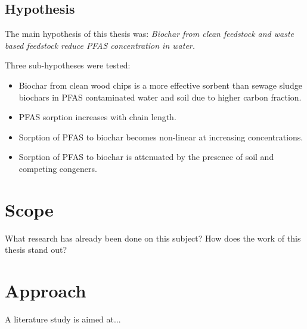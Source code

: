 \subsection{Hypothesis}\label{sec:hypotheis}
The main hypothesis of this thesis was:
\textit{Biochar from clean feedstock and waste based feedstock reduce PFAS concentration in water.}

Three sub-hypotheses were tested:
\begin{itemize}
    \item Biochar from clean wood chips is a more effective sorbent than sewage sludge biochars in PFAS contaminated water and soil due to higher carbon fraction.
    \item PFAS sorption increases with chain length.
    \item Sorption of PFAS to biochar becomes non-linear at increasing concentrations.
    \item Sorption of PFAS to biochar is attenuated by the presence of soil and competing congeners. 
\end{itemize}
\section{Scope} 
What research has already been done on this subject? How does the work of this thesis stand out?
\section{Approach}
A literature study is aimed at...







